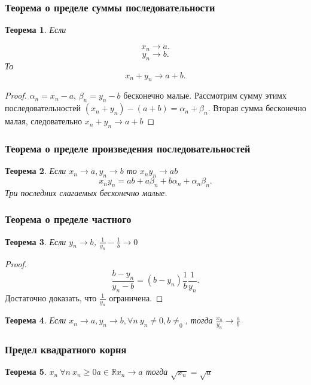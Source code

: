 \documentclass[a4paper]{article}
\newtheorem{theorem}{Теорема}
\begin{document}
\subsubsection{Теорема о пределе суммы последовательности}
\begin{theorem}
Если 

    \[
    
    x_n \to a
    .\] 
    \[
    y_n \to b
    .\] 
    То
    \[
    x_n + y_n \to a + b
    .\] 
\end{theorem}
\begin{proof}
    $\alpha_n = x_n - a$,  $\beta_n = y_n - b$ бесконечно малые. 
    Рассмотрим  сумму этимх последовательностей $(x_n + y_n) - (a + b) = \alpha_n + \beta_n$. Вторая сумма бесконечно малая, следовательно  $x_n + y_n \to a + b$
\end{proof}
\subsubsection{Теорема о пределе произведения последовательностей}
\begin{theorem}
    Если $x_n \to a, y_n \to b $ то $ x_n y_n \to ab$
    \[
    x_n y_n = ab + a\beta_n + b \alpha_n + \alpha_n \beta_n
    .\] 
    Три последних слагаемых бесконечно малые.
\end{theorem}
\subsubsection{Теорема о пределе частного}
 \begin{theorem}
Если $y_n \to b$, $\frac{1}{y_n} - \frac{1}{b} \to 0$
\end{theorem}
\begin{proof}
   \[
       \frac{b - y_n}{y_n- b} = (b - y_n)  \frac{1}{b}\frac{1}{y_n}
   .\] 
   Достаточно доказать, что $\frac{1}{y_n}$ ограничена.
\end{proof}
\begin{theorem}
    Если $x_n \to a, y_n \to b , \forall n ~ y_n \neq 0, b\neq_0$, тогда
    $\frac{x_n}{y_n} \to \frac{a}{b}$
\end{theorem}
\subsubsection{Предел квадратного корня}
\begin{theorem}
    $x_n ~\forall n ~x_n \ge 0  a \in \mathbb{R} x_n \to a$ тогда $\sqrt{x_n} = \sqrt{a}$
\end{theorem}
\end{document}
